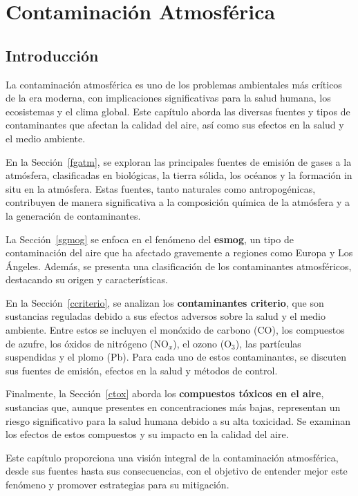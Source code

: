 \chapter{Contaminaci\'on Atmosf\'erica}
\section*{Introducción}

La contaminación atmosférica es uno de los problemas ambientales más críticos de la era moderna, con implicaciones significativas para la salud humana, los ecosistemas y el clima global. Este capítulo aborda las diversas fuentes y tipos de contaminantes que afectan la calidad del aire, así como sus efectos en la salud y el medio ambiente. 

En la Sección~\ref{fgatm}, se exploran las principales fuentes de emisión de gases a la atmósfera, clasificadas en biológicas, la tierra sólida, los océanos y la formación in situ en la atmósfera. Estas fuentes, tanto naturales como antropogénicas, contribuyen de manera significativa a la composición química de la atmósfera y a la generación de contaminantes.

La Sección~\ref{sgmog} se enfoca en el fenómeno del \textbf{esmog}, un tipo de contaminación del aire que ha afectado gravemente a regiones como Europa y Los Ángeles. Además, se presenta una clasificación de los contaminantes atmosféricos, destacando su origen y características.

En la Sección~\ref{ccriterio}, se analizan los \textbf{contaminantes criterio}, que son sustancias reguladas debido a sus efectos adversos sobre la salud y el medio ambiente. Entre estos se incluyen el monóxido de carbono (CO), los compuestos de azufre, los óxidos de nitrógeno (NO$_x$), el ozono (O$_3$), las partículas suspendidas y el plomo (Pb). Para cada uno de estos contaminantes, se discuten sus fuentes de emisión, efectos en la salud y métodos de control.

Finalmente, la Sección~\ref{ctox} aborda los \textbf{compuestos tóxicos en el aire}, sustancias que, aunque presentes en concentraciones más bajas, representan un riesgo significativo para la salud humana debido a su alta toxicidad. Se examinan los efectos de estos compuestos y su impacto en la calidad del aire.

Este capítulo proporciona una visión integral de la contaminación atmosférica, desde sus fuentes hasta sus consecuencias, con el objetivo de entender mejor este fenómeno y promover estrategias para su mitigación.

